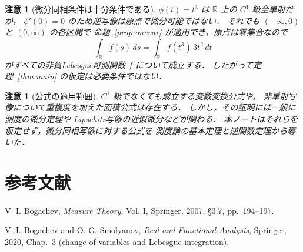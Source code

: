 \documentclass[a5paper,10pt,onecolumn]{jsarticle}
\theoremstyle{mathnotetheorem}
\newtheorem{remark}[theorem]{注意}
\newcommand{\R}{\mathbb{R}}
\begin{document}
\begin{remark}[微分同相条件は十分条件である]
$\phi(t)=t^3$ は $\R$ 上の $C^1$ 級全単射だが，
$\phi'(0)=0$ のため逆写像は原点で微分可能ではない．
それでも $(-\infty,0)$ と $(0,\infty)$ の各区間で
命題~\ref{prop:onevar} が適用でき，原点は零集合なので
\[
 \int_{\R}f(s)\,ds
 =\int_{\R}f(t^3)\,3t^2\,dt
\]
がすべての非負Lebesgue可測関数 $f$ について成立する．
したがって定理~\ref{thm:main} の仮定は必要条件ではない．
\end{remark}

\begin{remark}[公式の適用範囲]
$C^1$ 級でなくても成立する変数変換公式や，
非単射写像について重複度を加えた面積公式は存在する．
しかし，その証明には一般に測度の微分定理や
Lipschitz写像の近似微分などが関わる．
本ノートはそれらを仮定せず，微分同相写像に対する公式を
測度論の基本定理と逆関数定理から導いた．
\end{remark}

\section*{参考文献}
\begin{enumerate}[label={[\arabic*]},leftmargin=2.6zw]
 \item V. I. Bogachev, \emph{Measure Theory}, Vol. I,
 Springer, 2007, \S3.7, pp.~194--197.
 \item V. I. Bogachev and O. G. Smolyanov,
 \emph{Real and Functional Analysis}, Springer, 2020,
 Chap.~3 (change of variables and Lebesgue integration).
\end{enumerate}
\end{document}

